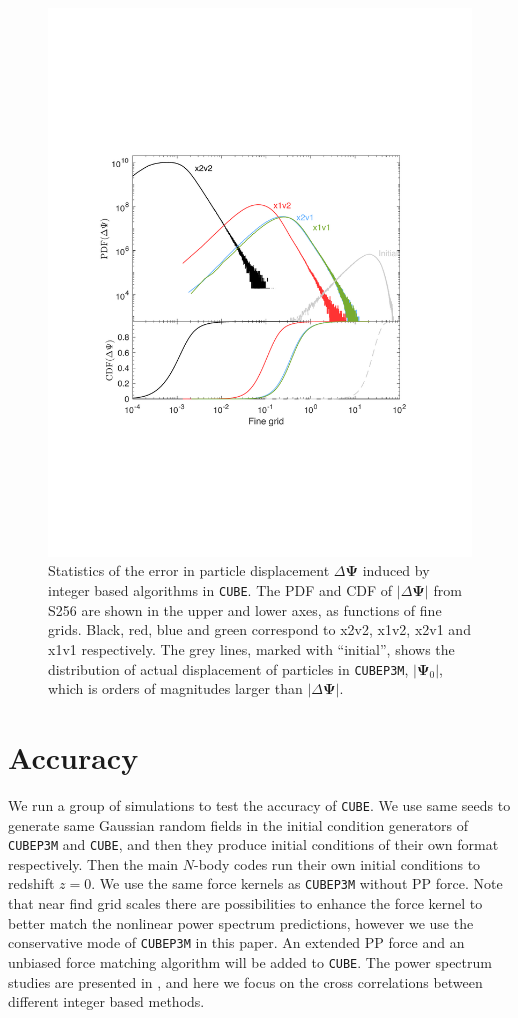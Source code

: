 \documentclass[10pt,twocolumn,preprint]{emulateapj}
\newcommand{\bs}{\boldsymbol}
\begin{document}
\begin{figure}[]
\centering
  \includegraphics[width=0.99\linewidth]{f8}
 \caption{Statistics of the error in particle displacement $\Delta{\bs\Psi}$ induced by integer based algorithms in {\tt CUBE}. The PDF and CDF of $|\Delta{\bs\Psi}|$ from S256 are shown in the upper and lower axes, as functions of fine grids. Black, red, blue and green correspond to x2v2, x1v2, x2v1 and x1v1 respectively. The grey lines, marked with ``initial'', shows the distribution of actual displacement of particles in {\tt CUBEP3M}, $|{\bs\Psi}_0|$, which is orders of magnitudes larger than $|\Delta{\bs\Psi}|$. }
\label{fig.dsp}
\end{figure}

\section{Accuracy}\label{s.results}
We run a group of simulations to test the accuracy of {\tt CUBE}. We use same seeds to generate same Gaussian random fields in the initial condition generators of {\tt CUBEP3M} and {\tt CUBE}, and then they produce initial conditions of their own format respectively. Then the main $N$-body codes run their own initial conditions to redshift $z=0$. We use the same force kernels as {\tt CUBEP3M} without PP force. Note that near find grid scales there are possibilities to enhance the force kernel to better match the nonlinear power spectrum predictions, however we use the conservative mode of {\tt CUBEP3M} in this paper. An extended PP force and an unbiased force matching algorithm will be added to {\tt CUBE}. The power spectrum studies are presented in \citet{2013MNRAS.436..540H}, and here we focus on the cross correlations between different integer based methods.
\end{document}
